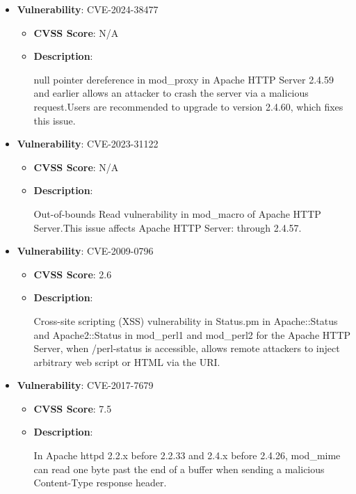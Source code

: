 \documentclass{article}
\begin{document}
\begin{itemize}
        \item \textbf{Vulnerability}: CVE-2024-38477
        \begin{itemize}
            \item \textbf{CVSS Score}:  N/A 
            \item \textbf{Description}:
            \parbox[t]{0.9\linewidth}{
                \ttfamily null pointer dereference in mod\_proxy in Apache HTTP Server 2.4.59 and earlier allows an attacker to crash the server via a malicious request.Users are recommended to upgrade to version 2.4.60, which fixes this issue.
            }
        \end{itemize}
    
        \item \textbf{Vulnerability}: CVE-2023-31122
        \begin{itemize}
            \item \textbf{CVSS Score}:  N/A 
            \item \textbf{Description}:
            \parbox[t]{0.9\linewidth}{
                \ttfamily Out-of-bounds Read vulnerability in mod\_macro of Apache HTTP Server.This issue affects Apache HTTP Server: through 2.4.57.
            }
        \end{itemize}
    
        \item \textbf{Vulnerability}: CVE-2009-0796
        \begin{itemize}
            \item \textbf{CVSS Score}:  2.6 
            \item \textbf{Description}:
            \parbox[t]{0.9\linewidth}{
                \ttfamily Cross-site scripting (XSS) vulnerability in Status.pm in Apache::Status and Apache2::Status in mod\_perl1 and mod\_perl2 for the Apache HTTP Server, when /perl-status is accessible, allows remote attackers to inject arbitrary web script or HTML via the URI.
            }
        \end{itemize}
    
        \item \textbf{Vulnerability}: CVE-2017-7679
        \begin{itemize}
            \item \textbf{CVSS Score}:  7.5 
            \item \textbf{Description}:
            \parbox[t]{0.9\linewidth}{
                \ttfamily In Apache httpd 2.2.x before 2.2.33 and 2.4.x before 2.4.26, mod\_mime can read one byte past the end of a buffer when sending a malicious Content-Type response header.
            }
        \end{itemize}
    

\end{itemize}
\end{document}
